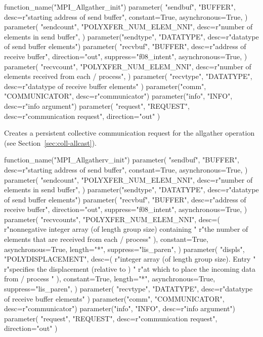\begin{mpi-binding}
    function_name("MPI_Allgather_init")
    parameter(
        "sendbuf",
        "BUFFER",
        desc=r"starting address of send buffer",
        constant=True,
        asynchronous=True,
    )
    parameter(
        "sendcount",
        "POLYXFER_NUM_ELEM_NNI",
        desc=r"number of elements in send buffer",
    )
    parameter("sendtype", "DATATYPE", desc=r"datatype of send buffer elements")
    parameter(
        "recvbuf",
        "BUFFER",
        desc=r"address of receive buffer",
        direction="out",
        suppress="f08_intent",
        asynchronous=True,
    )
    parameter(
        "recvcount",
        "POLYXFER_NUM_ELEM_NNI",
        desc=r"number of elements received from each \MPI/ process",
    )
    parameter(
        "recvtype", "DATATYPE", desc=r"datatype of receive buffer elements"
    )
    parameter("comm", "COMMUNICATOR", desc=r"communicator")
    parameter("info", "INFO", desc=r"info argument")
    parameter(
        "request", "REQUEST", desc=r"communication request", direction="out"
    )
\end{mpi-binding}

Creates a persistent collective communication request for the allgather operation
(see Section~\ref{sec:coll-allcast}).

\begin{mpi-binding}
    function_name("MPI_Allgatherv_init")
    parameter(
        "sendbuf",
        "BUFFER",
        desc=r"starting address of send buffer",
        constant=True,
        asynchronous=True,
    )
    parameter(
        "sendcount",
        "POLYXFER_NUM_ELEM_NNI",
        desc=r"number of elements in send buffer",
    )
    parameter("sendtype", "DATATYPE", desc=r"datatype of send buffer elements")
    parameter(
        "recvbuf",
        "BUFFER",
        desc=r"address of receive buffer",
        direction="out",
        suppress="f08_intent",
        asynchronous=True,
    )
    parameter(
        "recvcounts",
        "POLYXFER_NUM_ELEM_NNI",
        desc=(
            r"nonnegative integer array (of length group size) containing "
            r"the number of elements that are received from each \MPI/ process"
        ),
        constant=True,
        asynchronous=True,
        length="*",
        suppress="lis_paren",
    )
    parameter(
        "displs",
        "POLYDISPLACEMENT",
        desc=(
            r"integer array (of length group size). Entry  "
            r"specifies the displacement (relative to ) "
            r"at which to place the incoming data from \MPI/ process "
        ),
        constant=True,
        length="*",
        asynchronous=True,
        suppress="lis_paren",
    )
    parameter(
        "recvtype", "DATATYPE", desc=r"datatype of receive buffer elements"
    )
    parameter("comm", "COMMUNICATOR", desc=r"communicator")
    parameter("info", "INFO", desc=r"info argument")
    parameter(
        "request", "REQUEST", desc=r"communication request", direction="out"
    )
\end{mpi-binding}

